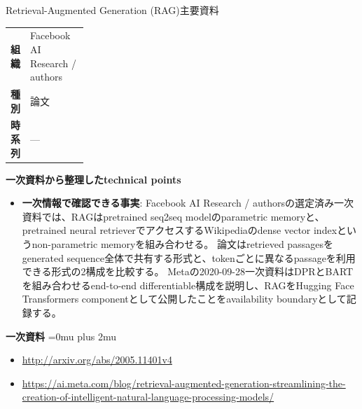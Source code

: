 \begin{technicalnote}{Retrieval-Augmented Generation (RAG)}{主要資料}
\begingroup
\begin{tabularx}{\linewidth}{@{}>{\bfseries}p{0.22\linewidth}X@{}}
組織 & Facebook AI Research / authors \\
種別 & 論文 \\
時系列 & — \\
\end{tabularx}
\smallskip
{\bfseries 一次資料から整理したtechnical points}
\begin{itemize}[leftmargin=1.5em,itemsep=0.35em]
\item \textbf{一次情報で確認できる事実}: Facebook AI Research / authorsの選定済み一次資料では、RAGはpretrained seq2seq modelのparametric memoryと、pretrained neural retrieverでアクセスするWikipediaのdense vector indexというnon-parametric memoryを組み合わせる。 論文はretrieved passagesをgenerated sequence全体で共有する形式と、tokenごとに異なるpassageを利用できる形式の2構成を比較する。 Metaの2020-09-28一次資料はDPRとBARTを組み合わせるend-to-end differentiable構成を説明し、RAGをHugging Face Transformers componentとして公開したことをavailability boundaryとして記録する。
\end{itemize}
\begin{minipage}{\linewidth}
\begin{samepage}
{\bfseries 一次資料}
\begingroup\sloppy
\Urlmuskip=0mu plus 2mu\relax
\begin{itemize}[leftmargin=1.5em,itemsep=0.25em]
\item {\scriptsize\url{http://arxiv.org/abs/2005.11401v4}}
\item {\scriptsize\url{https://ai.meta.com/blog/retrieval-augmented-generation-streamlining-the-creation-of-intelligent-natural-language-processing-models/}}
\end{itemize}
\endgroup
\end{samepage}
\end{minipage}
\endgroup
\end{technicalnote}
\medskip

